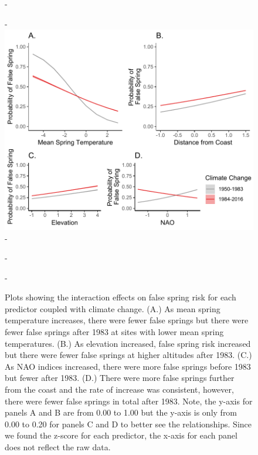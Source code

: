 \documentclass{article}\usepackage[]{graphicx}\usepackage[]{color}
\begin{document}
{\begin{figure} [H]
  -\begin{center}
  -\includegraphics[width=16cm]{..//figures/InteractionPlots/IntrxnPlots_orig.pdf}
  -\caption{Plots showing the interaction effects on false spring risk for each predictor coupled with climate change. (A.) As mean spring temperature increases, there were fewer false springs but there were fewer false springs after 1983 at sites with lower mean spring temperatures. (B.) As elevation increased, false spring risk increased but there were fewer false springs at higher altitudes after 1983. (C.) As NAO indices increased, there were more false springs before 1983 but fewer after 1983. (D.) There were more false springs further from the coast and the rate of increase was consistent, however, there were fewer false springs in total after 1983. Note, the y-axis for panels A and B are from 0.00 to 1.00 but the y-axis is only from 0.00 to 0.20 for panels C and D to better see the relationships. Since we found the z-score for each predictor, the x-axis for each panel does not reflect the raw data.}\label{fig:intrxns}
  -\end{center}
  -\end{figure}}
  
\end{document}
